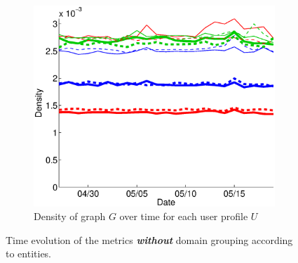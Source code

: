 \documentclass{sig-alternate}
\begin{document}
\begin{figure}
  \begin{subfigure}{.45\textwidth}
    \includegraphics[width=\textwidth]{figures/plots/density.eps}
    \caption{Density of graph $G$ over time for each user profile $U$}
    \label{fig:density}
  \end{subfigure}

  \caption{Time evolution of the metrics \textbf{\textit{without}} domain grouping according to entities.}
  \label{fig:metrics_without_entities}
  \end{figure}
\end{document}
